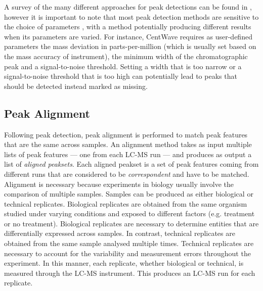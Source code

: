 A survey of the many different approaches for peak detections can be found in \cite{Katajamaa2007,Castillo2011,Alonso2015}, however it is important to note that most peak detection methods are sensitive to the choice of parameters \cite{Tautenhahn2008}, with a method potentially producing different results when its parameters are varied. For instance, CentWave requires as user-defined parameters the mass deviation in parts-per-million (which is usually set based on the mass accuracy of instrument), the minimum width of the chromatographic peak and a signal-to-noise threshold. Setting a width that is too narrow or a signal-to-noise threshold that is too high can potentially lead to peaks that should be detected instead marked as missing. 

\subsection{Peak Alignment\label{sub:alignment-tools}}

Following peak detection, peak alignment is performed to match peak features that are the same across samples. An alignment method takes as input multiple lists of peak features --- one from each LC-MS run --- and produces as output a list of \emph{aligned peaksets}. Each aligned peakset is a set of peak features coming from different runs that are considered to be \emph{correspondent} and have to be matched. Alignment is necessary because experiments in biology usually involve the comparison of multiple samples. Samples can be produced as either biological or technical replicates. Biological replicates are obtained from the same organism studied under varying conditions and exposed to different factors (e.g. treatment or no treatment). Biological replicates are necessary to determine entities that are differentially expressed across samples. In contrast, technical replicates are obtained from the same sample analysed multiple times. Technical replicates are necessary to account for the variability and measurement errors throughout the experiment. In this manner, each replicate, whether biological or technical, is measured through the LC-MS instrument. This produces an LC-MS run for each replicate.

